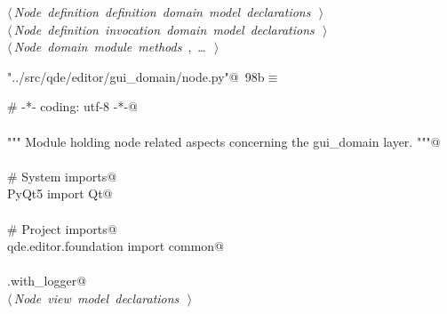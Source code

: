 \documentclass[
    a4paper,      %
    10pt,         %
    openright,    %
    notitlepage,  %
    parskip=half, %
]{scrreprt}       %
\theoremstyle{definition}                    %
\begin{document}
\begin{flushleft}
\begin{minipage}{\linewidth}
\begin{list}{}{}
\mbox{}\lstinline@@\hbox{$\langle\,${\itshape Node definition definition domain model declarations}\nobreak\ {\footnotesize {}}$\,\rangle$}\lstinline@@\\
\mbox{}\lstinline@@\hbox{$\langle\,${\itshape Node definition invocation domain model declarations}\nobreak\ {\footnotesize {}}$\,\rangle$}\lstinline@@\\
\mbox{}\lstinline@@\hbox{$\langle\,${\itshape Node domain module methods}\nobreak\ {\footnotesize {}, \ldots\ }$\,\rangle$}\lstinline@@\\
\mbox{}\lstinline@@{\NWsep}
\end{list}
\vspace{-1.5ex}
\footnotesize
\begin{list}{}{\setlength{\itemsep}{-\parsep}\setlength{\itemindent}{-\leftmargin}}

\item{}
\end{list}
\end{minipage}\vspace{4ex}
\end{flushleft}
\begin{flushleft} \small
\begin{minipage}{\linewidth}\label{scrap158}\raggedright\small
{} \verb@"../src/qde/editor/gui_domain/node.py"@\nobreak\ {\footnotesize {98b}}$\equiv$
\vspace{-1ex}
\begin{list}{}{} \item
\mbox{}\lstinline@# -*- coding: utf-8 -*-@\\
\mbox{}\lstinline@@\\
\mbox{}\lstinline@""" Module holding node related aspects concerning the gui_domain layer. """@\\
\mbox{}\lstinline@@\\
\mbox{}\lstinline@# System imports@\\
\mbox{}\lstinline@from PyQt5 import Qt@\\
\mbox{}\lstinline@@\\
\mbox{}\lstinline@# Project imports@\\
\mbox{}\lstinline@from qde.editor.foundation import common@\\
\mbox{}\lstinline@@\\
\mbox{}\lstinline@common.with_logger@\\
\mbox{}\lstinline@@\hbox{$\langle\,${\itshape Node view model declarations}\nobreak\ {\footnotesize {}}$\,\rangle$}\lstinline@@\\
\mbox{}\lstinline@@{\NWsep}
\end{list}
\vspace{-1.5ex}
\footnotesize
\begin{list}{}{\setlength{\itemsep}{-\parsep}\setlength{\itemindent}{-\leftmargin}}

\item{}
\end{list}
\end{minipage}\vspace{4ex}
\end{flushleft}
\end{document}
